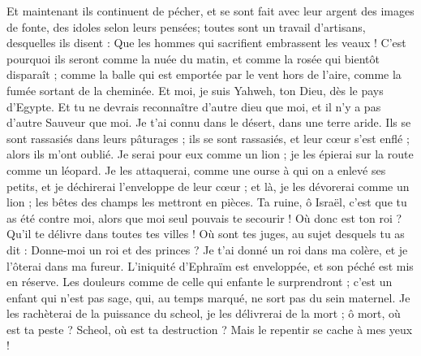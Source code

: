 \begin{multicols}{2}
Et maintenant ils continuent de pécher, et se sont fait avec leur argent des images de fonte, des idoles selon leurs pensées; toutes sont un travail d'artisans, desquelles ils disent : Que les hommes qui sacrifient embrassent les veaux !
C'est pourquoi ils seront comme la nuée du matin, et comme la rosée qui bientôt disparaît ; comme la balle qui est emportée par le vent hors de l'aire, comme la fumée sortant de la cheminée.
Et moi, je suis Yahweh, ton Dieu, dès le pays d'Egypte. Et tu ne devrais reconnaître d'autre dieu que moi, et il n'y a pas d'autre Sauveur que moi.
Je t'ai connu dans le désert, dans une terre aride.
Ils se sont rassasiés dans leurs pâturages ; ils se sont rassasiés, et leur cœur s'est enflé ; alors ils m'ont oublié.
Je serai pour eux comme un lion ; je les épierai sur la route comme un léopard.
Je les attaquerai, comme une ourse à qui on a enlevé ses petits, et je déchirerai l'enveloppe de leur cœur ; et là, je les dévorerai comme un lion ; les bêtes des champs les mettront en pièces.
Ta ruine, ô Israël, c'est que tu as été contre moi, alors que moi seul pouvais te secourir !
Où donc est ton roi ? Qu'il te délivre dans toutes tes villes ! Où sont tes juges, au sujet desquels tu as dit : Donne-moi un roi et des princes ?
Je t'ai donné un roi dans ma colère, et je l'ôterai dans ma fureur.
L'iniquité d'Ephraïm est enveloppée, et son péché est mis en réserve.
Les douleurs comme de celle qui enfante le surprendront ; c'est un enfant qui n'est pas sage, qui, au temps marqué, ne sort pas du sein maternel.
Je les rachèterai de la puissance du scheol, je les délivrerai de la mort ; ô mort, où est ta peste ? Scheol, où est ta destruction ? Mais le repentir se cache à mes yeux !

\end{multicols}
